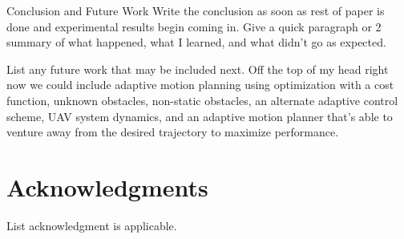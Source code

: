 
\begin{section}{Conclusion and Future Work} \label{sec:conclusion}
Write the conclusion as soon as rest of paper is done and experimental results begin coming in. Give a quick paragraph or 2 summary of what happened, what I learned, and what didn't go as expected.

List any future work that may be included next. Off the top of my head right now we could include adaptive motion planning using optimization with a cost function, unknown obstacles, non-static obstacles, an alternate adaptive control scheme, UAV system dynamics, and an adaptive motion planner that's able to venture away from the desired trajectory to maximize performance.

\end{section}

\section*{Acknowledgments} 
List acknowledgment is applicable.


